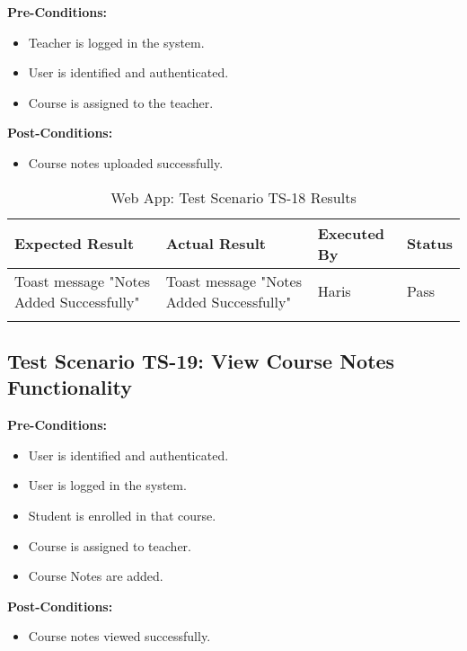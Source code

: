 \textbf{Pre-Conditions: }
\begin{itemize}

\item Teacher is logged in the system.
\item User is identified and authenticated.
\item Course is assigned to the teacher.

\end{itemize}

\textbf{Post-Conditions: }
\begin{itemize}

\item Course notes uploaded successfully.

\end{itemize}


\bigskip

\begin{longtable}{|p{4cm}|p{4cm}|p{2cm}|p{2cm}|}
\hline
\textbf{Expected Result} & \textbf{Actual Result} & \textbf{Executed By} & \textbf{Status}\\
\hline
Toast message "Notes Added Successfully" &
Toast message "Notes Added Successfully" &
Haris &
Pass \\
\hline

\caption{Web App: Test Scenario TS-18 Results}
\end{longtable}



\subsection{Test Scenario TS-19: View Course Notes Functionality}

\textbf{Pre-Conditions: }
\begin{itemize}

\item User is identified and authenticated.
\item User is logged in the system.
\item Student is enrolled in that course.
\item Course is assigned to teacher.
\item Course Notes are added.

\end{itemize}

\textbf{Post-Conditions: }
\begin{itemize}

\item Course notes viewed successfully.

\end{itemize}


